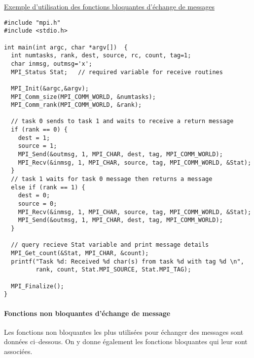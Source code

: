 \documentclass[11pt,a4paper]{article}
\begin{document}
\underline{Exemple d'utilisation des fonctions bloquantes d'échange de messages}

\begin{lstlisting}[style=customcpp]
#include "mpi.h"
#include <stdio.h>

int main(int argc, char *argv[])  {
  int numtasks, rank, dest, source, rc, count, tag=1;  
  char inmsg, outmsg='x';
  MPI_Status Stat;   // required variable for receive routines

  MPI_Init(&argc,&argv);
  MPI_Comm_size(MPI_COMM_WORLD, &numtasks);
  MPI_Comm_rank(MPI_COMM_WORLD, &rank);

  // task 0 sends to task 1 and waits to receive a return message
  if (rank == 0) {
    dest = 1;
    source = 1;
    MPI_Send(&outmsg, 1, MPI_CHAR, dest, tag, MPI_COMM_WORLD);
    MPI_Recv(&inmsg, 1, MPI_CHAR, source, tag, MPI_COMM_WORLD, &Stat);
  } 
  // task 1 waits for task 0 message then returns a message
  else if (rank == 1) {
    dest = 0;
    source = 0;
    MPI_Recv(&inmsg, 1, MPI_CHAR, source, tag, MPI_COMM_WORLD, &Stat);
    MPI_Send(&outmsg, 1, MPI_CHAR, dest, tag, MPI_COMM_WORLD);
  }

  // query recieve Stat variable and print message details
  MPI_Get_count(&Stat, MPI_CHAR, &count);
  printf("Task %d: Received %d char(s) from task %d with tag %d \n",
         rank, count, Stat.MPI_SOURCE, Stat.MPI_TAG);

  MPI_Finalize();
}
\end{lstlisting}

\paragraph{Fonctions non bloquantes d'échange de message}

Les fonctions non bloquantes les plus utilisées pour échanger des messages
sont données ci--dessous. On y donne également les fonctions bloquantes
qui leur sont associées.
\end{document}
